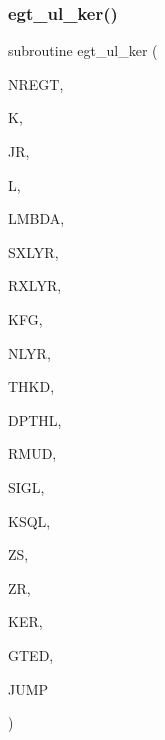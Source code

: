 \subsubsection{\texorpdfstring{egt\+\_\+ul\+\_\+ker()}{egt\_ul\_ker()}}
{\footnotesize\ttfamily subroutine egt\+\_\+ul\+\_\+ker (\begin{DoxyParamCaption}\item[{integer}]{N\+R\+E\+GT,  }\item[{integer}]{K,  }\item[{integer}]{JR,  }\item[{integer}]{L,  }\item[{real(kind=ql)}]{L\+M\+B\+DA,  }\item[{integer}]{S\+X\+L\+YR,  }\item[{integer}]{R\+X\+L\+YR,  }\item[{integer}]{K\+FG,  }\item[{integer}]{N\+L\+YR,  }\item[{real(kind=ql), dimension (nlyr)}]{T\+H\+KD,  }\item[{real(kind=ql), dimension (nlyr)}]{D\+P\+T\+HL,  }\item[{real(kind=ql), dimension(0\+:nlyr)}]{R\+M\+UD,  }\item[{complex(kind=ql), dimension (nlyr)}]{S\+I\+GL,  }\item[{complex(kind=ql), dimension (nlyr)}]{K\+S\+QL,  }\item[{real(kind=ql)}]{ZS,  }\item[{real(kind=ql)}]{ZR,  }\item[{complex (kind=ql), dimension(jnlo-\/nregt\+:jnhi,7)}]{K\+ER,  }\item[{complex (kind=ql), dimension(nregt,7)}]{G\+T\+ED,  }\item[{logical}]{J\+U\+MP }\end{DoxyParamCaption})}

